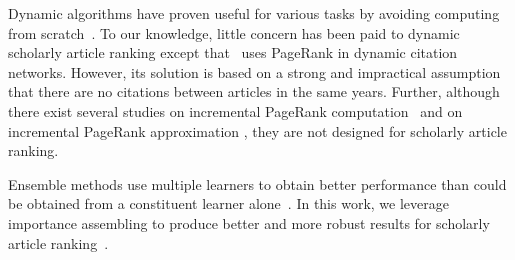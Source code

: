 Dynamic algorithms have proven useful for various tasks by avoiding computing from scratch~\cite{RamalingamR93}.
To our knowledge, little concern has been paid to dynamic scholarly article ranking except that~\cite{GhoshKHLL11} uses PageRank in dynamic citation networks. However, its solution is based on a strong and impractical assumption that there are no citations between articles in the same years.
Further, although there exist several studies on incremental PageRank computation~\cite{DesikanPSK05,AbiteboulPC03,WuR09} and on incremental PageRank approximation \cite{BahmaniCG10,BahmaniKMU12}, they are not designed for scholarly article ranking.
%


Ensemble methods use multiple learners to obtain better performance than could be obtained from a constituent learner alone~\cite{zhihua-book}.
In this work, we leverage  importance assembling  to produce better and more robust results for scholarly article ranking~\cite{zhihua-book,wsdmcup,DuanAMHH16}.
